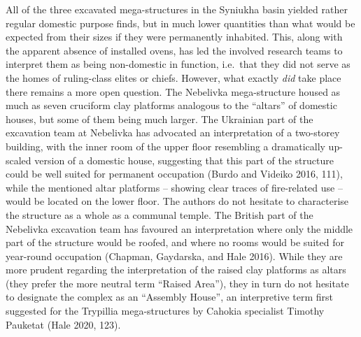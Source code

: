 \documentclass[
  12pt,
  a4paper, twoside]{book}
\begin{document}
All of the three excavated mega-structures in the Syniukha basin yielded rather regular domestic purpose finds, but in much lower quantities than what would be expected from their sizes if they were permanently inhabited. This, along with the apparent absence of installed ovens, has led the involved research teams to interpret them as being non-domestic in function, i.e.~that they did not serve as the homes of ruling-class elites or chiefs. However, what exactly \emph{did} take place there remains a more open question. The Nebelivka mega-structure housed as much as seven cruciform clay platforms analogous to the ``altars'' of domestic houses, but some of them being much larger. The Ukrainian part of the excavation team at Nebelivka has advocated an interpretation of a two-storey building, with the inner room of the upper floor resembling a dramatically up-scaled version of a domestic house, suggesting that this part of the structure could be well suited for permanent occupation (Burdo and Videiko 2016, 111), while the mentioned altar platforms -- showing clear traces of fire-related use -- would be located on the lower floor. The authors do not hesitate to characterise the structure as a whole as a communal temple. The British part of the Nebelivka excavation team has favoured an interpretation where only the middle part of the structure would be roofed, and where no rooms would be suited for year-round occupation (Chapman, Gaydarska, and Hale 2016). While they are more prudent regarding the interpretation of the raised clay platforms as altars (they prefer the more neutral term ``Raised Area''), they in turn do not hesitate to designate the complex as an ``Assembly House'', an interpretive term first suggested for the Trypillia mega-structures by Cahokia specialist Timothy Pauketat (Hale 2020, 123).
\end{document}

